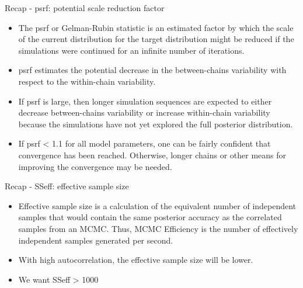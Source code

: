 \documentclass[
  ignorenonframetext,
]{beamer}
\providecommand{\tightlist}{%
  \setlength{\itemsep}{0pt}\setlength{\parskip}{0pt}}
\begin{document}
\begin{frame}
\begin{block}{Recap - psrf: potential scale reduction factor}
\protect\hypertarget{recap---psrf-potential-scale-reduction-factor}{}
\begin{itemize}
\tightlist
\item
  The psrf or Gelman-Rubin statistic is an estimated factor by which the
  scale of the current distribution for the target distribution might be
  reduced if the simulations were continued for an infinite number of
  iterations.
\item
  psrf estimates the potential decrease in the between-chains
  variability with respect to the within-chain variability.
\item
  If psrf is large, then longer simulation sequences are expected to
  either decrease between-chains variability or increase within-chain
  variability because the simulations have not yet explored the full
  posterior distribution.
\item
  If psrf \textless{} 1.1 for all model parameters, one can be fairly
  confident that convergence has been reached. Otherwise, longer chains
  or other means for improving the convergence may be needed.
\end{itemize}
\end{block}
\end{frame}

\begin{frame}
\begin{block}{Recap - SSeff: effective sample size}
\protect\hypertarget{recap---sseff-effective-sample-size}{}
\begin{itemize}
\item
  Effective sample size is a calculation of the equivalent number of
  independent samples that would contain the same posterior accuracy as
  the correlated samples from an MCMC. Thus, MCMC Efficiency is the
  number of effectively independent samples generated per second.
\item
  With high autocorrelation, the effective sample size will be lower.
\item
  We want SSeff \textgreater{} 1000
\end{itemize}
\end{block}
\end{frame}
\end{document}
